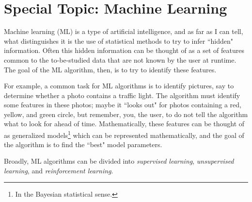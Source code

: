 \chapter{Special Topic: Machine Learning}

Machine learning (ML) 
is a type of artificial intelligence, and as far
as I can tell, what distinguishes it is the use of statistical
methods to try to infer ``hidden" information. Often this hidden
information can be thought of as a set of features common to the
to-be-studied data that are not known by the user at runtime. 
The goal of the ML algorithm, then, is to try to identify these
features.

For example, a common task for ML algorithms is to identify pictures,
say to determine whether a photo contains a traffic light. The algorithm
must identify some features in these photos; maybe it ``looks out" for
photos containing a red, yellow, and green circle, but remember,
you, the user, to do not tell the algorithm what to look for ahead of time.
Mathematically, these features can be thought of as generalized 
models\footnote{In the Bayesian statistical sense.} which can be
represented mathematically, and the goal of the algorithm is to
find the ``best" model parameters.

Broadly, ML algorithms can be divided into {\it supervised
learning}, {\it unsupervised
learning}, and {\it reinforcement
learning}.


